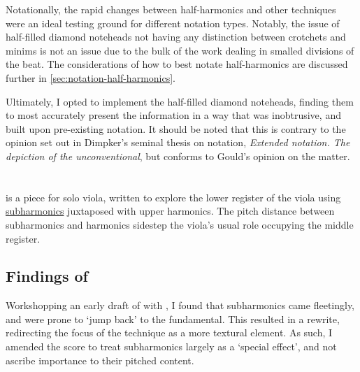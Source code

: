 Notationally, the rapid changes between half-harmonics and other techniques were an ideal testing ground for different notation types. 
Notably, the issue of half-filled diamond noteheads not having any distinction between crotchets and minims is not an issue due to the bulk of the work dealing in smalled divisions of the beat.
The considerations of how to best notate half-harmonics are discussed further in \autoref{sec:notation-half-harmonics}.

Ultimately, I opted to implement the half-filled diamond noteheads, finding them to most accurately present the information in a way that was inobtrusive, and built upon pre-existing notation.
It should be noted that this is contrary to the opinion set out in Dimpker's seminal thesis on notation, \emph{Extended notation. The depiction of the
unconventional}, but conforms to Gould's opinion on the matter.\autocites[120--121]{dimpkerExtendedNotationDepiction2012}[61]{gouldBars2011}


\section{\violaPiece}\label{sec:violaPiece}
\violaPiece\space is a piece for solo viola, written to explore the lower register of the viola using \hyperref[sec:subharmonicsDiscussion]{subharmonics} juxtaposed with upper harmonics. 
The pitch distance between subharmonics and harmonics sidestep the viola's usual role occupying the middle register.



\subsection{Findings of \violaPiece}

Workshopping an early draft of \violaPiece\space with \violaParticipant, I found that subharmonics came fleetingly, and were prone to `jump back' to the fundamental.\autocite[]{appleseedFeedbackExploratorySession2019}
This resulted in a rewrite, redirecting the focus of the technique as a more textural element. 
As such, I amended the score to treat subharmonics largely as a `special effect', and not ascribe importance to their pitched content.


